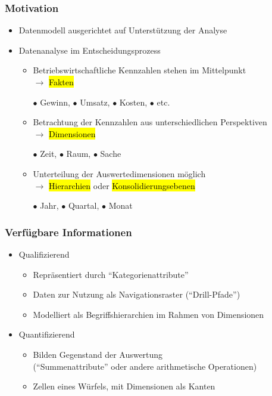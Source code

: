         \begin{frame}

        \frametitle{Motivation}
        \begin{itemize}
        \item Datenmodell ausgerichtet auf Unterstützung der Analyse
        \item Datenanalyse im Entscheidungsprozess
          \begin{itemize}
          \item Betriebswirtschaftliche Kennzahlen  stehen im Mittelpunkt\\ $\to$ \hl{Fakten}

            $\bullet$ Gewinn, $\bullet$ Umsatz, $\bullet$ Kosten, $\bullet$ etc.
          \item Betrachtung der Kennzahlen aus unterschiedlichen Perspektiven\\ $\to$ \hl{Dimensionen}

            $\bullet$  Zeit, $\bullet$  Raum, $\bullet$  Sache
          \item Unterteilung der Auswertedimensionen möglich\\ $\to$ \hl{Hierarchien} oder
            \hl{Konsolidierungsebenen}

          $\bullet$  Jahr, $\bullet$  Quartal, $\bullet$  Monat
        \end{itemize}
        \end{itemize}
        \end{frame}

        \begin{frame}

        \frametitle{Verfügbare Informationen}

        \begin{itemize}
        \item Qualifizierend
        \begin{itemize}
        \item Repräsentiert durch "`Kategorienattribute"'
        \item Daten zur Nutzung als Navigationsraster ("`Drill-Pfade"')
        \item Modelliert als Begriffshierarchien im Rahmen von Dimensionen
        \end{itemize}
        \item Quantifizierend
        \begin{itemize}
        \item Bilden Gegenstand der Auswertung \\
        ("`Summenattribute"' oder andere arithmetische Operationen)
        \item Zellen eines Würfels, mit Dimensionen als Kanten
        \end{itemize}
        \end{itemize}

        \end{frame}

